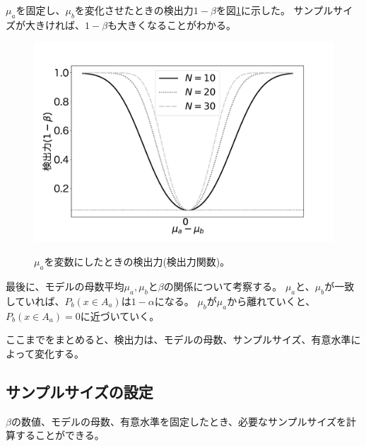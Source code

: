 $\mu_a$を固定し、$\mu_b$を変化させたときの検出力$1-\beta$を図\ref{fig:power_of_test_N_mu0_variable}に示した。
サンプルサイズが大きければ、$1-\beta$も大きくなることがわかる。

\begin{figure}
    \begin{center}
        \includegraphics[width=15cm]{./image/04_/power_of_test.pdf}
        \label{fig:power_of_test_N_mu0_variable}
        \caption{$\mu_a$を変数にしたときの検出力(検出力関数)。}
    \end{center}
\end{figure}



最後に、モデルの母数平均$\mu_a,\mu_b$と$\beta$の関係について考察する。
$\mu_a$と、$\mu_b$が一致していれば、$P_b(x \in A_a )$は$1-\alpha$になる。
$\mu_b$が$\mu_a$から離れていくと、$P_b(x \in A_a)=0$に近づいていく。

ここまでをまとめると、検出力は、モデルの母数、サンプルサイズ、有意水準によって変化する。


\subsection{サンプルサイズの設定}
$\beta$の数値、モデルの母数、有意水準を固定したとき、必要なサンプルサイズを計算することができる。%




